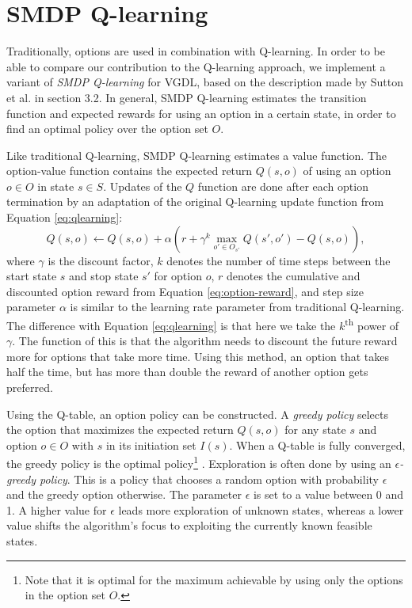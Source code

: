 \chapter{SMDP Q-learning}

Traditionally, options are used in combination with Q-learning. In order to be
able to compare our contribution to the Q-learning approach, we implement a
variant of \emph{SMDP Q-learning} \cite{sutton1999between} for VGDL, based on
the description made by Sutton et al. in section 3.2. In general, SMDP
Q-learning estimates the transition function and expected rewards for using an
option in a certain state, in order to find an optimal policy over the option
set $O$.

Like traditional Q-learning, SMDP Q-learning estimates a value function. The
option-value function contains the expected return $Q(s, o)$ of using an option
$o \in O$ in state $s \in S$. Updates of the $Q$ function are done after each
option termination by an adaptation of the original Q-learning update function
from Equation \ref{eq:qlearning}:
\begin{equation}
	\label{eq:smdp-qlearning}
	Q(s, o) \gets Q(s, o) + \alpha \left(r + \gamma^k \max_{o' \in O_{s'}}Q(s',
	o') - Q(s, o)\right),
\end{equation}
where $\gamma$ is the discount factor, $k$ denotes the number of time steps
between the start state $s$ and stop state $s'$ for option $o$, $r$ denotes
the cumulative and discounted option reward from Equation
\ref{eq:option-reward}, and step size parameter $\alpha$ is similar to the
learning rate parameter from traditional Q-learning.  The difference with
Equation \ref{eq:qlearning} is that here we take the $k$\textsuperscript{th}
power of $\gamma$. The function of this is that the algorithm needs to discount
the future reward more for options that take more time. Using this method, an
option that takes half the time, but has more than double the reward of another
option gets preferred.

Using the Q-table, an option policy can be constructed. A \emph{greedy policy}
selects the option that maximizes the expected return $Q(s, o)$ for any state
$s$ and option $o \in O$ with $s$ in its initiation set $I(s)$. When a Q-table
is fully converged, the greedy policy is the optimal policy\footnote{Note that
it is optimal for the maximum achievable by using only the options in the option
set $O$.} \cite{sutton1999between}. Exploration is often done by using an
\emph{$\epsilon$-greedy policy}. This is a policy that chooses a random option
with probability $\epsilon$ and the greedy option otherwise. The parameter
$\epsilon$ is set to a value between 0 and 1. A higher value for $\epsilon$
leads more exploration of unknown states, whereas a lower value shifts the
algorithm's focus to exploiting the currently known feasible states.

